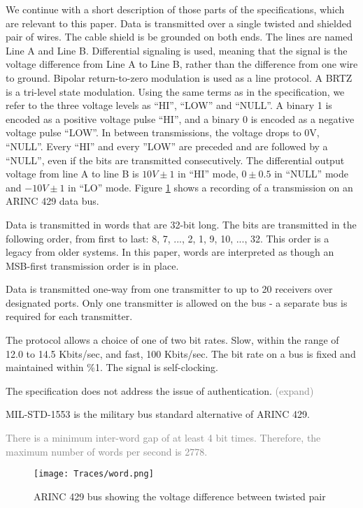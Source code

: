 \documentclass[conference]{IEEEtran}
\begin{document}
  We continue with a short description of those parts of the specifications, which are relevant to this paper. Data is transmitted over a single twisted and shielded pair of wires. The cable shield is be grounded on both ends. The lines are named Line A and Line B. Differential signaling is used, meaning that the signal is the voltage difference from Line A to Line B, rather than the difference from one wire to ground. Bipolar return-to-zero modulation is used as a line protocol. A BRTZ is a tri-level state modulation. Using the same terms as in the specification, we refer to the three voltage levels as ``HI'', ``LOW'' and ``NULL''. A binary 1 is encoded as a positive voltage pulse ``HI'', and a binary 0 is encoded as a negative voltage pulse ``LOW''. In between transmissions, the voltage drops to 0V, ``NULL''. Every ``HI'' and every ''LOW'' are preceded and are followed by a ``NULL'', even if the bits are transmitted consecutively. The differential output voltage from line A to line B is $10V \pm 1$ in ``HI'' mode, $0 \pm 0.5$ in ``NULL'' mode and $-10V \pm 1$ in ``LO'' mode.  Figure \ref{fig:word_example} shows a recording of a transmission on an ARINC 429 data bus.
  
  Data is transmitted in words that are 32-bit long. The bits are transmitted in the following order, from first to last: 8, 7, ..., 2, 1, 9, 10, ..., 32. This order is a legacy from older systems. In this paper, words are interpreted as though an MSB-first transmission order is in place.
  
  Data is transmitted one-way from one transmitter to up to 20 receivers over designated ports. Only one transmitter is allowed on the bus - a separate bus is required for each transmitter.  
   
  The protocol allows a choice of one of two bit rates. Slow, within the range of 12.0 to 14.5 Kbits/sec, and fast, 100 Kbits/sec. The bit rate on a bus is fixed and maintained within \%1. The signal is self-clocking.
  
  The specification does not address the issue of authentication. \textcolor{gray}{(expand)}
   
  MIL-STD-1553 \cite{} is the military bus standard alternative of ARINC 429.
  
  \textcolor{gray}{There is a minimum inter-word gap of at least 4 bit times. Therefore, the maximum number of words per second is 2778.}
  
  \begin{figure}[t]
    \centering
    \texttt{[image: Traces/word.png]}
    \caption{ARINC 429 bus showing the voltage difference between twisted pair}
    \label{fig:word_example}
  \end{figure}
  
\end{document}
